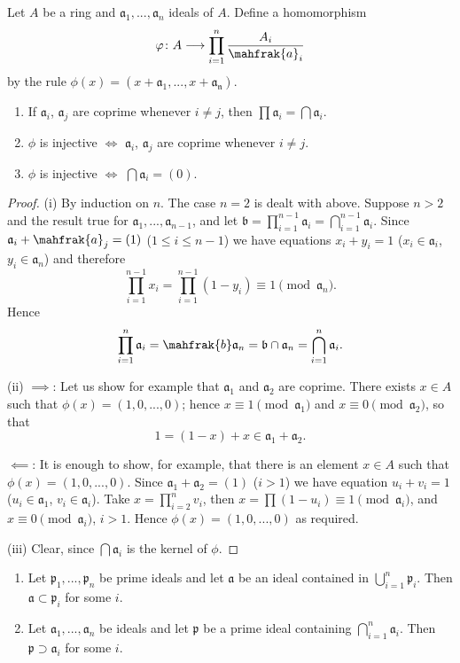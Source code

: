 Let $A$ be a ring and $\mathfrak{a}_1,...,\mathfrak{a}_n$ ideals
of $A$. Define a homomorphism
\[
\phi\colon A\longrightarrow\prod_{i=1}^n\frac{A_i}{\mahfrak{a}_i}
\]
by the rule $\phi(x)=(x+\mathfrak{a}_1,...,x+\mathfrak{a_n})$.
\begin{proposition}
\begin{enumerate}[noitemsep,label=(\roman*)]
\item If $\mathfrak{a}_i$, $\mathfrak{a}_j$ are coprime whenever
  $i\neq j$, then $\prod\mathfrak{a}_i=\bigcap\mathfrak{a}_i$.
\item $\phi$ is injective $\iff$ $\mathfrak{a}_i$,
  $\mathfrak{a}_j$ are coprime whenever $i\neq j$.
\item $\phi$ is injective $\iff$ $\bigcap\mathfrak{a}_i=(0)$.
\end{enumerate}
\end{proposition}
\begin{proof}
(i) By induction on $n$. The case $n=2$ is dealt with
above. Suppose $n>2$ and the result true for
$\mathfrak{a}_1,...,\mathfrak{a}_{n-1}$, and let
$\mathfrak{b}=\prod_{i=1}^{n-1}\mathfrak{a}_i=\bigcap_{i=1}^{n-1}\mathfrak{a}_i$. Since
$\mathfrak{a}_i+\mahfrak{a}_j=(1)$ ($1\leq i\leq n-1$) we have
equations $x_i+y_i=1$ ($x_i\in\mathfrak{a}_i$,
$y_i\in\mathfrak{a}_n$) and therefore
\[
\prod_{i=1}^{n-1}x_i=\prod_{i=1}^{n-1}(1-y_i)\equiv 1\pmod{\mathfrak{a}_n}.
\]
Hence
\[
\prod_{i=1}^n\mathfrak{a}_i=\mahfrak{b}\mathfrak{a}_n=\mathfrak{b}\cap\mathfrak{a}_n=\bigcap_{i=1}^n\mathfrak{a}_i.
\]

(ii) $\implies$: Let us show for example that $\mathfrak{a}_1$
and $\mathfrak{a}_2$ are coprime. There exists $x\in A$ such that
$\phi(x)=(1,0,...,0)$; hence $x\equiv 1\pmod{\mathfrak{a}_1}$ and
$x\equiv 0\pmod{\mathfrak{a}_2}$, so that
\[
1=(1-x)+x\in\mathfrak{a}_1+\mathfrak{a}_2.
\]

$\impliedby$: It is enough to show, for example, that there is an
element $x\in A$ such that $\phi(x)=(1,0,...,0)$. Since
$\mathfrak{a}_1+\mathfrak{a}_2=(1)$ ($i>1$) we have equation
$u_i+v_i=1$ ($u_i\in\mathfrak{a}_1$,
$v_i\in\mathfrak{a}_i$). Take $x=\prod_{i=2}^n v_i$, then
$x=\prod(1-u_i)\equiv 1\pmod{\mathfrak{a}_i}$, and $x\equiv
0\pmod{\mathfrak{a}_i}$, $i>1$. Hence $\phi(x)=(1,0,...,0)$ as
required.

(iii) Clear, since $\bigcap\mathfrak{a}_i$ is the kernel of
$\phi$.
\end{proof}
\begin{proposition}
\begin{enumerate}[noitemsep,label=(\roman*)]
\item Let $\mathfrak{p}_1,...,\mathfrak{p}_n$ be prime ideals and
  let $\mathfrak{a}$ be an ideal contained in
  $\bigcup_{i=1}^n\mathfrak{p}_i$. Then
  $\mathfrak{a}\subset\mathfrak{p}_i$ for some $i$.
\item Let $\mathfrak{a}_1,...,\mathfrak{a}_n$ be ideals and let
  $\mathfrak{p}$ be a prime ideal containing
  $\bigcap_{i=1}^n\mathfrak{a}_i$. Then
  $\mathfrak{p}\supset\mathfrak{a}_i$ for some $i$.
\end{enumerate}
\end{proposition}
